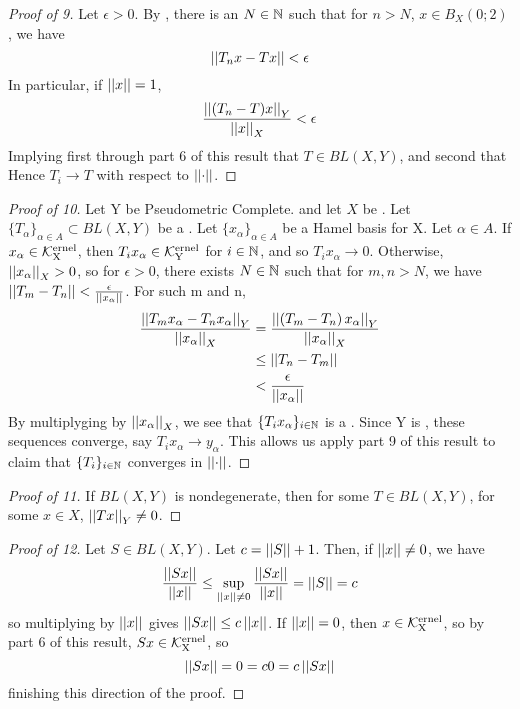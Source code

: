 \begin{prop}
\begin{proof}[Proof of 9]
    Let $\epsilon > 0$. 
    By \UniformConvergence, 
    there is an $N \in \mathbb{N}$ such that 
    for $n>N$, $x \in B_X(0;2)$, we have
    \begin{equation}
    \left|\left| T_nx-Tx \right|\right| < \epsilon
    \end{equation}
    In particular, if $\left|\left| x \right|\right| = 1$, 
    \begin{equation}
    \frac{\left|\left| (T_n-T)x \right|\right|_Y}{\left|\left| x \right|\right|_X} < \epsilon
    \end{equation}
    Implying first through part 6 of this result
    that $T \in BL(X,Y)$, and second that
    Hence $T_i \to T$ with respect to $\left|\left| \cdot \right|\right|$. 
\end{proof}
\begin{proof}[Proof of 10]
    Let Y be Pseudometric Complete. 
    and let $X$ be \NonDegenerate. 
    Let $\{T_\alpha\}_{\alpha \in A} \subset BL(X,Y)$ 
    be a \PseudometricCauchySequence.
    Let $\{x_{\alpha}\}_{\alpha \in A}$ be a Hamel basis for X. 
    Let $\alpha \in A$. 
    If $x_\alpha  \in \bf\mathcal{K}\rm^{ernel}_X$, then $T_ix_{\alpha} \in \bf\mathcal{K}\rm^{ernel}_Y$ for $i \in \mathbb{N}$, 
    and so $T_ix_{\alpha} \to 0$. 
    Otherwise,  $\left|\left| x_{\alpha} \right|\right|_X > 0$, so
    for $\epsilon > 0$, 
    there exists $N \in \mathbb{N}$ such that
    for $m,n>N$, we have 
    $\left|\left| T_m-T_n \right|\right| < \frac{\epsilon}{\left|\left| x_\alpha \right|\right|}$.
    For such m and n, 
    \begin{align*}
        \frac{\left|\left| T_mx_\alpha-T_nx_\alpha \right|\right|_Y}{\left|\left| x_\alpha \right|\right|_X}  &= \frac{\left|\left| \left( T_m-T_n\right)x_\alpha \right|\right|_Y}{\left|\left| x_\alpha \right|\right|_X} \\
        & \leq \left|\left| T_n-T_m \right|\right|\\ 
        & < \frac{\epsilon}{\left|\left| x_\alpha \right|\right|}\\
    \end{align*}
    By multiplyging by $\left|\left| x_\alpha \right|\right|_X$, 
    we see that $\{T_ix_\alpha\}_{i \in \mathbb{N}}$ 
    is a \PseudometricCauchySequence.
    Since Y is \Complete, these sequences converge, say
    $T_ix_\alpha \to y_\alpha$. 
    This allows us apply part 9 of  this result
    to claim that $\{T_i\}_{i \in \mathbb{N}}$ converges in $\left|\left| \cdot \right|\right|$. 
\end{proof}
\begin{proof}[Proof of 11]
    If $BL(X,Y)$ is nondegenerate, then
    for some $T \in BL(X,Y)$, 
    for some $x \in X$, 
    $\left|\left| Tx \right|\right|_Y \neq 0$. 
\end{proof}
\begin{proof}[Proof of 12]
	Let $S \in BL(X,Y)$. 
	Let $c=\left|\left| S \right|\right|+1$. %
	Then, if $\left|\left| x \right|\right| \neq 0$, we have 
	\begin{equation}
		\frac{\left|\left| Sx \right|\right|}{\left|\left| x \right|\right|} \leq \sup\limits_{\left|\left| x \right|\right| \neq 0} \frac{\left|\left| Sx \right|\right|}{\left|\left| x \right|\right|} = \left|\left| S \right|\right|=c
	\end{equation}
	so multiplying by $\left|\left| x \right|\right|$ gives $\left|\left| Sx \right|\right| \leq c \left|\left| x \right|\right|$. 
	If $\left|\left| x \right|\right| = 0$, then $x \in \bf\mathcal{K}\rm^{ernel}_X$, so by part 6 of this result, $Sx \in \bf\mathcal{K}\rm^{ernel}_X$, so 
	\begin{equation}
		\left|\left| Sx \right|\right| =0 = c 0  = c \left|\left| Sx \right|\right|
	\end{equation}
	finishing this direction of the proof. 
	

\end{proof}
\end{prop}
